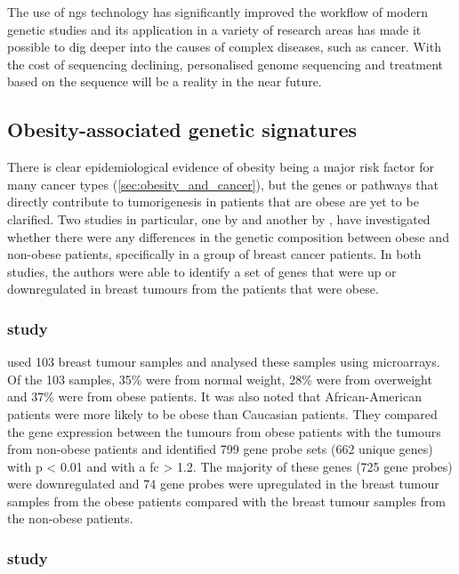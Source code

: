 The use of \gls{ngs} technology has significantly improved the workflow of modern genetic studies and its application in a variety of research areas has made it possible to dig deeper into the causes of complex diseases, such as cancer.
With the cost of sequencing declining, personalised genome sequencing and treatment based on the sequence will be a reality in the near future.

\subsection{Obesity-associated genetic signatures}
\label{sub:obesity_associated_genetic_signatures}

There is clear epidemiological evidence of obesity being a major risk factor for many cancer types (\cref{sec:obesity_and_cancer}), but the genes or pathways that directly contribute to tumorigenesis in patients that are obese are yet to be clarified.
Two studies in particular, one by \citet{Creighton2012} and another by \citet{Fuentes-Mattei2014}, have investigated whether there were any differences in the genetic composition between obese and non-obese patients, specifically in a group of breast cancer patients.
In both studies, the authors were able to identify a set of genes that were up or downregulated in breast tumours from the patients that were obese.

\subsubsection{\citet{Creighton2012} study}
\label{ssub:creighton_study}

\citet{Creighton2012} used 103 breast tumour samples and analysed these samples using microarrays.
Of the 103 samples, 35\% were from normal weight, 28\% were from overweight and 37\% were from obese patients.
It was also noted that African-American patients were more likely to be obese than Caucasian patients.
They compared the gene expression between the tumours from obese patients with the tumours from non-obese patients and identified 799 gene probe sets (662 unique genes) with p \textless{} 0.01 and with a \gls{fc} \textgreater{} 1.2.
The majority of these genes (725 gene probes) were downregulated and 74 gene probes were upregulated in the breast tumour samples from the obese patients compared with the breast tumour samples from the non-obese patients.

\subsubsection{\citet{Fuentes-Mattei2014} study}
\label{ssub:fuentes_mattei_study}

